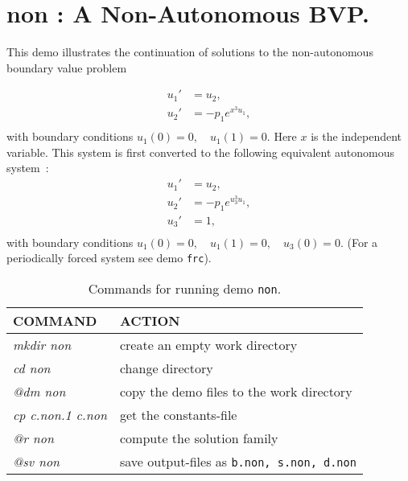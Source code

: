\documentclass[12pt]{report}
\begin{document}
\newpage
\section{ non : A Non-Autonomous BVP.} \label{sec:Demos_non}
This demo illustrates the continuation of solutions to
the non-autonomous boundary value problem

\begin{equation} \begin{array}{cl}
  u_1 ' &= u_2  ,  \\
  u_2 ' &= -p_1  e^{x^3 u_1} , \\\end{array} \end{equation}
with boundary conditions $ u_1(0)=0 ,  \quad  u_1(1)=0.$
Here $x$ is the independent variable.
This system is first converted to the following equivalent
autonomous system~:
\begin{equation} \begin{array}{cl}
  u_1 ' &= u_2  ,  \\
  u_2 ' &= -p_1  e^{u_3^3 u_1} ,  \\  
  u_3 ' &= 1 ,  \\
\end{array} \end{equation}
 with boundary conditions $ u_1(0)=0 ,  \quad  u_1(1)=0, \quad u_3(0)=0.$
(For a periodically forced system see demo {\tt frc}).

\begin{table}[htbp]
\begin{center}
\begin{tabular}{| l | l |}
\hline
  COMMAND  & ACTION \\
\hline
  {\it mkdir non} & create an empty work directory \\ 
  {\it cd non} & change directory \\
  {\it @dm non} & copy the demo files to the work directory \\
\hline

  {\it cp c.non.1 c.non} & get the constants-file \\ 
  {\it @r non} & compute the solution family \\ 
  {\it @sv non} & save output-files as {\tt b.non, s.non, d.non} \\ 
\hline
\end{tabular}
\caption{Commands for running demo {\tt non}.}
\label{tbl:demo_non}
\end{center}
\end{table}
\end{document}
